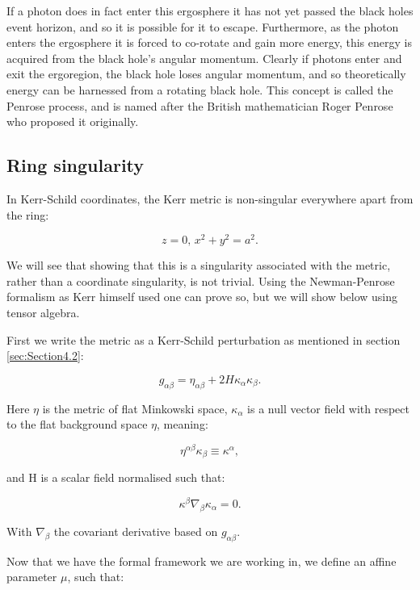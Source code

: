 \documentclass[oneside,openright,frontopenright, singlespacing]{dmathesis}
\begin{document}
\vspace{1em}
	If a photon does in fact enter this ergosphere it has not yet passed the black holes event horizon, and so it is possible for it to escape. Furthermore, as the photon enters the ergosphere it is forced to co-rotate and gain more energy, this energy is acquired from the black hole's angular momentum. Clearly if photons enter and exit the ergoregion, the black hole loses angular momentum, and so theoretically energy can be harnessed from a rotating black hole. This concept is called the Penrose process\cite{penrose1971extraction}, and is named after the British mathematician Roger Penrose who proposed it originally.

\subsection{Ring singularity}\label{subsec:Subsection4.3.3}

\vspace{1em}
	In Kerr-Schild coordinates, the Kerr metric is non-singular everywhere apart from the ring:

	\[z=0\mbox{, } x^2+y^2=a^2.\]

	We will see that showing that this is a singularity associated with the metric, rather than a coordinate singularity, is not trivial. Using the Newman-Penrose formalism as Kerr himself used\cite{kerr2008discovering} one can prove so, but we will show below using tensor algebra. 

\vspace{1em}
	First we write the metric as a Kerr-Schild perturbation as mentioned in section \ref{sec:Section4.2}:

	\[g_{\alpha\beta} = \eta_{\alpha\beta} + 2H\kappa_\alpha\kappa_\beta.\]

	Here $\eta$ is the metric of flat Minkowski space, $\kappa_\alpha$ is a null vector field with respect to the flat background space $\eta$, meaning:

	\[\eta^{\alpha\beta}\kappa_\beta\equiv\kappa^\alpha,\]

	and H is a scalar field normalised such that:

	\[\kappa^\beta\nabla_\beta\kappa_\alpha=0.\]

	With $\nabla_\beta$ the covariant derivative based on $g_{\alpha\beta}$.

\vspace{1em}
	Now that we have the formal framework we are working in, we define an affine parameter $\mu$, such that:
\end{document}
